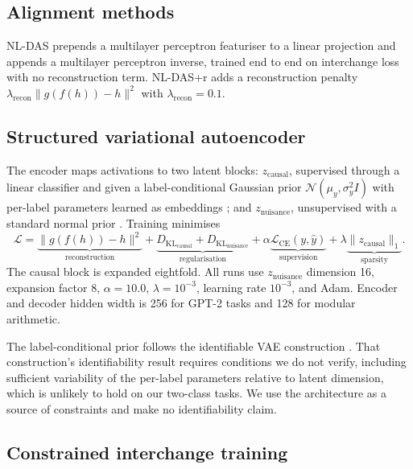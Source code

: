 \documentclass[11pt]{article}
\newcommand{\KL}{D_\mathrm{KL}}
\newcommand{\zc}{z_{\text{causal}}}
\newcommand{\zn}{z_{\text{nuisance}}}
\begin{document}
\subsection{Alignment methods}

NL-DAS prepends a multilayer perceptron featuriser to a linear projection and
appends a multilayer perceptron inverse, trained end to end on interchange loss
with no reconstruction term. NL-DAS+r adds a reconstruction penalty
$\lambda_\text{recon}\lVert g(f(h)) - h \rVert^2$ with
$\lambda_\text{recon} = 0.1$.

\subsection{Structured variational autoencoder}

The encoder maps activations to two latent blocks: $\zc$, supervised through a
linear classifier and given a label-conditional Gaussian prior
$\mathcal{N}(\mu_y, \sigma_y^2 I)$ with per-label parameters learned as
embeddings \citep{khemakhem2020variational}; and $\zn$, unsupervised with a
standard normal prior \citep{narayanaswamy2017learning}. Training minimises
\begin{equation}
\mathcal{L} = \underbrace{\lVert g(f(h)) - h \rVert^2}_{\text{reconstruction}}
+ \underbrace{\KL_\text{causal} + \KL_\text{nuisance}}_{\text{regularisation}}
+ \alpha \underbrace{\mathcal{L}_\text{CE}(y, \hat{y})}_{\text{supervision}}
+ \lambda \underbrace{\lVert \zc \rVert_1}_{\text{sparsity}}.
\label{eq:loss}
\end{equation}
The causal block is expanded eightfold. All runs use $\zn$ dimension 16,
expansion factor 8, $\alpha = 10.0$, $\lambda = 10^{-3}$, learning rate
$10^{-3}$, and Adam. Encoder and decoder hidden width is 256 for GPT-2 tasks and
128 for modular arithmetic.

The label-conditional prior follows the identifiable VAE construction
\citep{khemakhem2020variational}. That construction's identifiability result
requires conditions we do not verify, including sufficient variability of the
per-label parameters relative to latent dimension, which is unlikely to hold on
our two-class tasks. We use the architecture as a source of constraints and make
no identifiability claim.

\subsection{Constrained interchange training}
\end{document}
